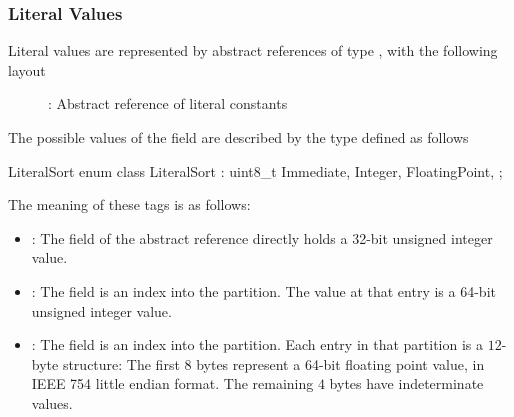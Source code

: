 
\subsubsection{Literal Values}
\label{sec:ifc-literal-values}

Literal values are represented by abstract references of type , with the following layout
%
\begin{figure}[htbp]
  \centering
  \caption{: Abstract reference of literal constants}
  \label{fig:ifc-lit-index}
\end{figure}
%

The possible values of the  field are described by the type  defined as follows
\begin{typedef}{LiteralSort}{}
	enum class LiteralSort : uint8_t {
		Immediate,
		Integer,
		FloatingPoint,
	};
\end{typedef}

The meaning of these tags is as follows:
\begin{itemize}
	\item {}: The  field of the abstract reference directly holds a 32-bit unsigned integer value.
	\item {}: The  field is an index into the  partition.  The value at that entry is a 64-bit unsigned integer value.
	\item {}: The  field is an index into the  partition. 
	Each entry in that partition is a $12$-byte structure: The first $8$ bytes represent 
	a 64-bit floating point value, in IEEE 754 little endian format.  The remaining $4$ bytes have indeterminate values.
\end{itemize}


\subsection{}
\label{sec:ifc:ExprSort:Lambda}

